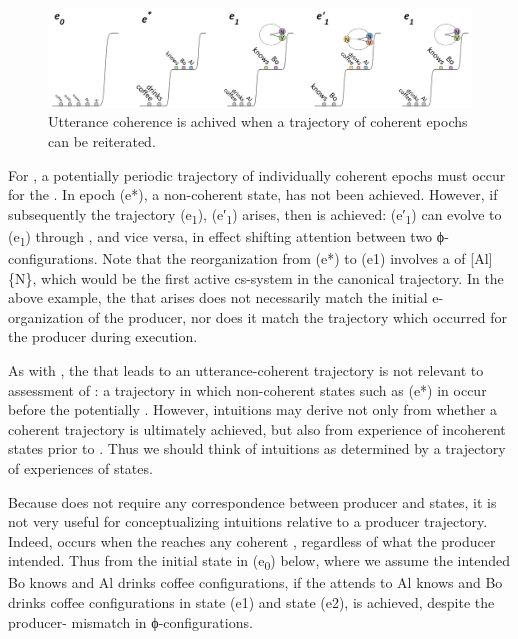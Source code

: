 \begin{figure}
\includegraphics[width=\textwidth]{figures/Tilsen-img125.png}
\caption{Utterance coherence is achived when a trajectory of coherent epochs can be reiterated.}
\label{fig:6:6}
\end{figure}
 
  For , a potentially periodic trajectory of individually coherent epochs must occur for the . In epoch (e*), a non-coherent state,  has not been achieved. However, if subsequently the trajectory (e\textsubscript{1}), (e′\textsubscript{1}) arises, then  is achieved: (e′\textsubscript{1}) can evolve to (e\textsubscript{1}) through , and vice versa, in effect shifting attention between two ϕ-configurations. Note that the reorganization from (e*) to (e1) involves a  of [Al]\{N\}, which would be the first active cs-system in the canonical trajectory. In the above example, the  that arises does not necessarily match the initial e-organization of the producer, nor does it match the trajectory which occurred for the producer during execution.

  As with , the  that leads to an utterance-coherent trajectory is not relevant to assessment of : a trajectory in which non-coherent states such as (e*) in {} occur before the potentially . However,  intuitions may derive not only from whether a coherent trajectory is ultimately achieved, but also from experience of incoherent states prior to . Thus we should think of  intuitions as determined by a trajectory of experiences of states.

  Because  does not require any correspondence between producer and  states, it is not very useful for conceptualizing  intuitions relative to a producer trajectory. Indeed,  occurs when the  reaches any coherent , regardless of what the producer intended. Thus from the initial state in (e\textsubscript{0}) below, where we assume the  intended {\textbar}Bo knows{\textbar} and {\textbar}Al drinks coffee{\textbar} configurations, if the  attends to {\textbar}Al knows{\textbar} and {\textbar}Bo drinks coffee{\textbar} configurations in state (e1) and state (e2),  is achieved, despite the producer- mismatch in ϕ-configurations.


